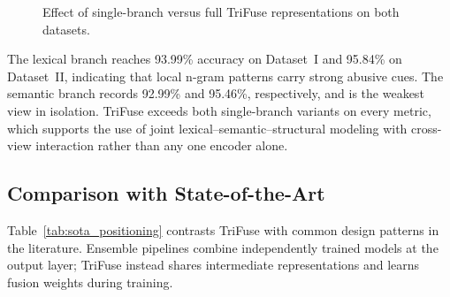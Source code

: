 \begin{figure}[!t]
\centering

\caption{Effect of single-branch versus full TriFuse representations on both datasets.}
\label{fig:feature_effect}
\end{figure}

The lexical branch reaches 93.99\% accuracy on Dataset~I and 95.84\% on Dataset~II, indicating that local n-gram patterns carry strong abusive cues. The semantic branch records 92.99\% and 95.46\%, respectively, and is the weakest view in isolation. TriFuse exceeds both single-branch variants on every metric, which supports the use of joint lexical--semantic--structural modeling with cross-view interaction rather than any one encoder alone.

\subsection{Comparison with State-of-the-Art}

Table~\ref{tab:sota_positioning} contrasts TriFuse with common design patterns in the literature. Ensemble pipelines combine independently trained models at the output layer; TriFuse instead shares intermediate representations and learns fusion weights during training.

\begin{table}[!t]
\caption{Architectural Positioning of TriFuse Against Existing Paradigms}
\label{tab:sota_positioning}
\centering
{}
\end{table}

